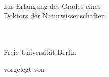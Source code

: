 \begin{titlepage}
	\tgherosfont
	\centering
	
	\vspace*{25pt}
	\begin{spacing}{2.0}
	{\LARGE \color{ctcolortitle}\textbf{\thesisTitle}}
	\end{spacing}
	\vspace*{100pt}
	
	{\large \textbf\thesisSubject} \\[5mm]
	{\large zur Erlangung des Grades eines\\
		Doktors der Naturwissenschaften} \\[5mm]
	
	\vfill
	
	\textsf{\thesisUniversityDepartment} \\[2mm]
	\textsf{\thesisUniversityInstitute} \\[4mm]
	{\Large Freie Universität Berlin}

	\vfill

	{\large vorgelegt von} \\[5mm]
	{\Large \thesisName} \\[5mm]

	\vfill

	\thesisCity\ \thesisYear \\

\end{titlepage}




\newpage\null\thispagestyle{empty}\newpage




\hfill
\vspace*{50pt}



